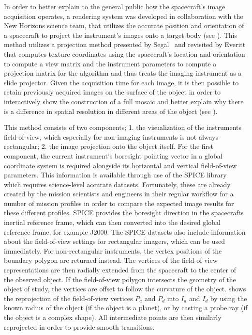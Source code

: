 In order to better explain to the general public how the spacecraft's image acquisition operates, a rendering system was developed in collaboration with the New Horizons science team, that utilizes the accurate position and orientation of a spacecraft to project the instrument's images onto a target body (see ).  This method utilizes a projection method presented by Segal~\cite{segal1992fast} and revisited by Everitt \cite{everitt2001projective} that computes texture coordinates using the spacecraft's location and orientation to compute a view matrix and the instrument parameters to compute a projection matrix for the algorithm and thus treats the imaging instrument as a slide projector.  Given the acquisition time for each image, it is then possible to retain previously acquired images on the surface of the object in order to interactively show the construction of a full mosaic and better explain why there is a difference in spatial resolution in different areas of the object (see ).

This method consists of two components;  1. the visualization of the instruments field-of-view, which especially for non-imaging instruments is not always rectangular;  2. the image projection onto the object itself.  For the first component, the current instrument's boresight pointing vector in a global coordinate system is required alongside its horizontal and vertical field-of-view parameters.  This information is available through use of the SPICE library~\cite{acton1996ancillary} which requires science-level accurate datasets. Fortunately, these are already created by the mission scientists and engineers in their regular workflow for a number of mission profiles in order to compare the expected image results for these different profiles.  SPICE provides the boresight direction in the spacecrafts inertial reference frame, which can then converted into the desired global reference frame, for example J2000.  The SPICE datasets also include information about the field-of-view settings for rectangular imagers, which can be used immediately.  For non-rectangular instruments, the vertex positions of the boundary polygon are returned instead.  The vertices of the field-of-view representations are then radially extended from the spacecraft to the center of the observed object.  If the field-of-view polygon intersects the geometry of the object of study, the vertices are offset to follow the curvature of the object.   shows the reprojection of the field-of-view vertices $P_a$ and $P_d$ into $I_a$ and $I_d$ by using the known radius of the object (if the object is a planet), or by casting a probe ray (if the object is a complex shape).  All intermediate points are then similarly reprojected in order to provide smooth transitions.

